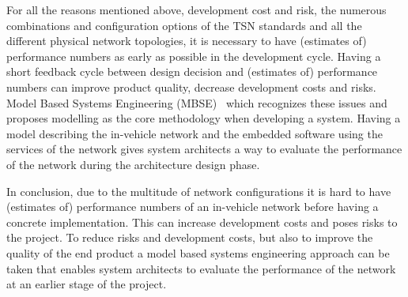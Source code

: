 For all the reasons mentioned above, development cost and risk, the numerous combinations and configuration options of the TSN standards and all the different physical network topologies, it is necessary to have (estimates of) performance numbers as early as possible in the development cycle. Having a short feedback cycle between design decision and (estimates of) performance numbers can improve product quality, decrease development costs and risks. Model Based Systems Engineering (MBSE)~\cite{wymore2018model} which recognizes these issues and proposes modelling as the core methodology when developing a system. Having a model describing the in-vehicle network and the embedded software using the services of the network gives system architects a way to evaluate the performance of the network during the architecture design phase.

In conclusion, due to the multitude of network configurations it is hard to have (estimates of) performance numbers of an in-vehicle network before having a concrete implementation. This can increase development costs and poses risks to the project. To reduce risks and development costs, but also to improve the quality of the end product a model based systems engineering approach can be taken that enables system architects to evaluate the performance of the network at an earlier stage of the project.